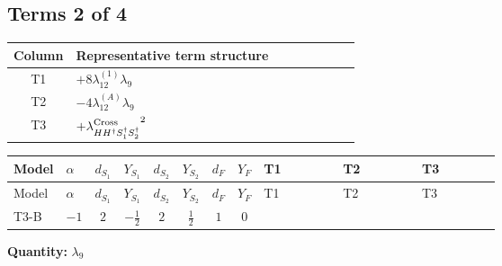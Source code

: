\documentclass[8pt]{article}
\begin{document}
\begin{landscape}
\subsection*{Terms 2 of 4}
\begin{center}
\begin{tabular}{@{}c >{\raggedright\arraybackslash}p{0.82\linewidth}@{}}
\toprule
Column & Representative term structure \\
\midrule
T1 & \(\displaystyle +8 {\lambda_{12}^{(1)}} {\lambda_{9}}\) \\
\midrule
T2 & \(\displaystyle -4 {\lambda_{12}^{(A)}} {\lambda_{9}}\) \\
\midrule
T3 & \(\displaystyle +{\lambda_{H H^\dagger S_1^\dagger S_2^\dagger}^{\rm Cross}}^2\) \\
\midrule
\bottomrule
\end{tabular}
\end{center}
\smallskip
\tiny
\begin{longtable}{@{}llcccccc >{\raggedright\arraybackslash}p{0.21\linewidth} >{\raggedright\arraybackslash}p{0.21\linewidth} >{\raggedright\arraybackslash}p{0.21\linewidth}@{}}
\toprule
Model & $\alpha$ & $d_{S_1}$ & $Y_{S_1}$ & $d_{S_2}$ & $Y_{S_2}$ & $d_F$ & $Y_F$ & T1 & T2 & T3 \\
\midrule
\endfirsthead
\toprule
Model & $\alpha$ & $d_{S_1}$ & $Y_{S_1}$ & $d_{S_2}$ & $Y_{S_2}$ & $d_F$ & $Y_F$ & T1 & T2 & T3 \\
\midrule
\endhead
T3-B & $-1$ & $2$ & $-\frac{1}{2}$ & $2$ & $\frac{1}{2}$ & $1$ & $0$ & \scriptsize\adjustbox{max width=\linewidth}{$\begin{gathered} +8 {\lambda_{12}^{(1)}} {\lambda_{9}}\end{gathered}$} & \scriptsize\adjustbox{max width=\linewidth}{$\begin{gathered} -4 {\lambda_{12}^{(A)}} {\lambda_{9}}\end{gathered}$} & \scriptsize\adjustbox{max width=\linewidth}{$\begin{gathered} +{\lambda_{H H^\dagger S_1^\dagger S_2^\dagger}^{\rm Cross}}^2\end{gathered}$} \\
\midrule
\bottomrule
\end{longtable}
\clearpage
\noindent\textbf{Quantity: }$\lambda_{9}$\par\smallskip

\end{landscape}
\end{document}
